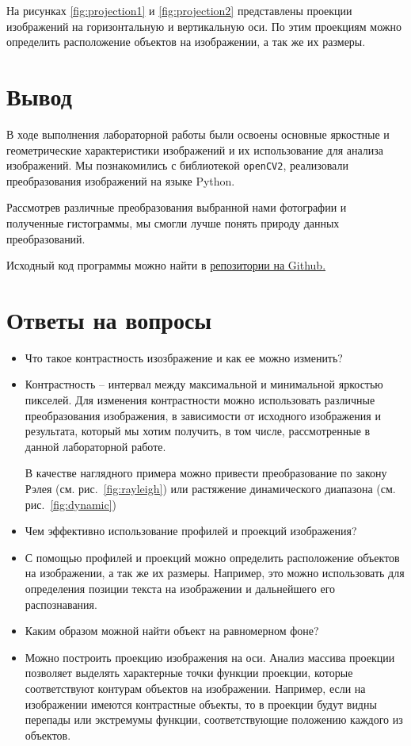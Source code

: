 На рисунках \ref{fig:projection1} и \ref{fig:projection2} представлены проекции изображений на горизонтальную и вертикальную оси. 
По этим проекциям можно определить расположение объектов на изображении, а так же их размеры.

\newpage\clearpage
\section{Вывод}

В ходе выполнения лабораторной работы были освоены основные яркостные и геометрические
характеристики изображений и их использование для анализа изображений. 
Мы познакомились с библиотекой \texttt{openCV2}, реализовали преобразования изображений на языке Python. 

Рассмотрев различные преобразования выбранной нами фотографии и полученные гистограммы, мы смогли лучше понять природу данных преобразований. 



Исходный код программы можно найти в \href{https://github.com/edelwiw/TechVision_Lab1}{репозитории на Github.}

\section{Ответы на вопросы}

\setcounter{question}{0}

\newcommand{\question}[1]{\item[Q\refstepcounter{question}\thequestion.] #1}
\newcommand{\answer}[1]{\item[A\thequestion.] #1}

\begin{itemize}

\question{Что такое контрастность изозбражение и как ее можно изменить?}
\answer{Контрастность -- интервал между максимальной и минимальной яркостью пикселей. 
Для изменения контрастности можно использовать различные преобразования изображения, 
в зависимости от исходного изображения и результата, который мы хотим получить,
в том числе, рассмотренные в данной лабораторной работе.

В качестве наглядного примера можно привести преобразование по закону Рэлея (см. рис.~\ref{fig:rayleigh}) или растяжение динамического диапазона (см. рис.~\ref{fig:dynamic})
}
\question{Чем эффективно использование профилей и проекций изображения?}
\answer{С помощью профилей и проекций можно определить расположение объектов на изображении, 
а так же их размеры. Например, это можно использовать для определения позиции текста на изображении и 
дальнейшего его распознавания.}

\question{Каким образом можной найти объект на равномерном фоне?}
\answer{Можно построить проекцию изображения на оси. Анализ массива проекции позволяет выделять 
характерные точки функции проекции, которые соответствуют контурам объектов на изображении. 
Например, если на изображении имеются контрастные объекты, то в проекции будут видны 
перепады или экстремумы функции, соответствующие положению каждого из объектов.}

\end{itemize}



